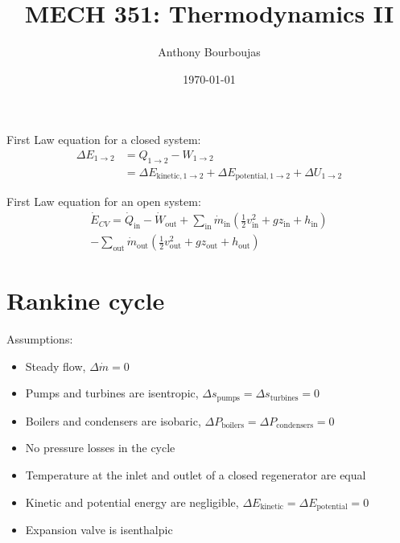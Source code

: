 \documentclass[10pt, twocolumn]{article}
\title{MECH 351: Thermodynamics II}
\date{\today}
\author{Anthony Bourboujas}
\begin{document}
\maketitle %

First Law equation for a closed system:
\begin{equation} \tag{1} \label{eq:First-Law-closed-system}
  \begin{split}
    \Delta E_{1 \rightarrow 2} & = Q_{1 \rightarrow 2} - W_{1 \rightarrow 2}                                                                                \\
    & = \Delta E_{\mathrm{kinetic},1 \rightarrow 2} + \Delta E_{\mathrm{potential},1 \rightarrow 2} + \Delta U_{1 \rightarrow 2}
  \end{split}
\end{equation}

First Law equation for an open system:
\begin{multline} \tag{2} \label{eq:First-Law-open-system}
  \dot{E}_{CV} = \dot{Q}_\mathrm{in} - \dot{W}_\mathrm{out}
  + \sum_\mathrm{in}{\dot{m}_\mathrm{in}\left( \frac{1}{2}v_\mathrm{in}^2 + gz_\mathrm{in} + h_\mathrm{in} \right)} \\
  - \sum_\mathrm{out}{\dot{m}_\mathrm{out}\left( \frac{1}{2}v_\mathrm{out}^2 + gz_\mathrm{out} + h_\mathrm{out} \right)}
\end{multline}



\section{Rankine cycle}
Assumptions:
\begin{itemize}
  \item Steady flow, \(\Delta \dot{m} = 0\)
  \item Pumps and turbines are isentropic, \(\Delta s_\mathrm{pumps} = \Delta s_\mathrm{turbines} = 0\)
  \item Boilers and condensers are isobaric, \(\Delta P_\mathrm{boilers} = \Delta P_\mathrm{condensers} = 0\)
  \item No pressure losses in the cycle
  \item Temperature at the inlet and outlet of a closed regenerator are equal
  \item Kinetic and potential energy are negligible, \(\Delta E_\mathrm{kinetic} = \Delta E_\mathrm{potential} = 0\)
  \item Expansion valve is isenthalpic
\end{itemize}
\end{document}
